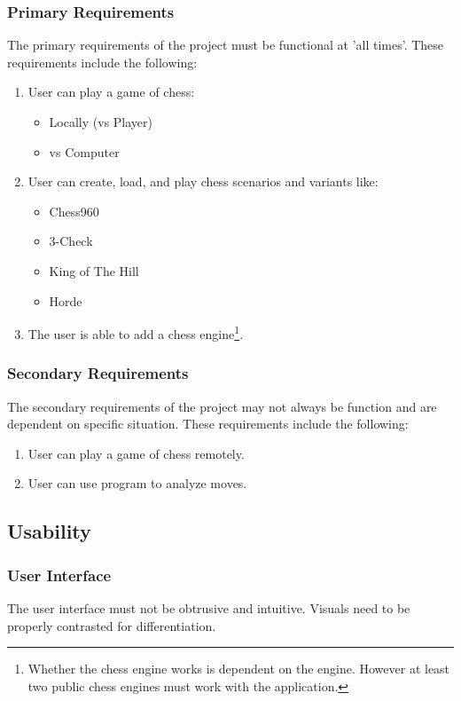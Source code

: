 \documentclass{article}
\begin{document}
\subsubsection{Primary Requirements}
The primary requirements of the project must be functional at 'all times'. These requirements include the following:
\begin{enumerate}
\item User can play a game of chess:
\begin{itemize}
\item Locally (vs Player)
\item vs Computer
\end{itemize}

\item User can create, load, and play chess scenarios and variants like:


\begin{itemize}
\item Chess960 
\item 3-Check
\item King of The Hill
\cite{variants}
\item Horde %
\end{itemize}

\item The user is able to add a chess engine\footnote{Whether the chess engine works is dependent on the engine. However at least two public chess engines must work with the application.}.
\end{enumerate}
\subsubsection{Secondary Requirements}
The secondary requirements of the project may not always be function and are dependent on specific situation. These requirements include the following:
\begin{enumerate}
\item User can play a game of chess remotely.
\item User can use program to analyze moves.
\end{enumerate}
\subsection{Usability}
\subsubsection{User Interface}
The user interface must not be obtrusive and intuitive. Visuals need to be properly contrasted for differentiation. 
\end{document}
